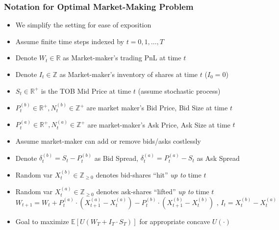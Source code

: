 \documentclass[handout]{beamer}
\begin{document}
\begin{frame}
\frametitle{Notation for Optimal Market-Making Problem}
\pause
\begin{itemize}[<+->]
\item We simplify the setting for ease of exposition
\item Assume finite time steps indexed by $t= 0, 1, \ldots, T$
\item Denote $W_t \in \mathbb{R}$ as Market-maker's trading PnL at time $t$
\item Denote $I_t \in \mathbb{Z}$ as Market-maker's inventory of shares at time $t$ ($I_0 = 0$)
\item $S_t \in \mathbb{R}^+$ is the TOB Mid Price at time $t$ (assume stochastic process)
\item $P_t^{(b)} \in \mathbb{R}^+, N_t^{(b)} \in \mathbb{Z}^+$ are market maker's Bid Price, Bid Size at time $t$
\item $P_t^{(a)} \in \mathbb{R}^+, N_t^{(a)} \in \mathbb{Z}^+$ are market-maker's Ask Price, Ask Size at time $t$
\item Assume market-maker can add or remove bids/asks costlessly
\item Denote $\delta_t^{(b)} = S_t - P_t^{(b)}$ as Bid Spread, $\delta_t^{(a)} = P_t^{(a)} - S_t$ as Ask Spread
\item Random var $X_t^{(b)} \in \mathbb{Z}_{\geq 0}$ denotes bid-shares ``hit'' {\em up to} time $t$
\item Random var $X_t^{(a)} \in \mathbb{Z}_{\geq 0}$ denotes ask-shares ``lifted'' {\em up to} time $t$
$$W_{t+1} = W_t + P_t^{(a)} \cdot (X_{t+1}^{(a)} - X_t^{(a)}) - P_t^{(b)} \cdot (X_{t+1}^{(b)} - X_t^{(b)}) \mbox{ , } I_t = X_t^{(b)} - X_t^{(a)}$$
\item Goal to maximize $\mathbb{E}[U(W_T + I_T \cdot S_T)]$ for appropriate concave $U(\cdot)$
\end{itemize}
\end{frame}
\end{document}
